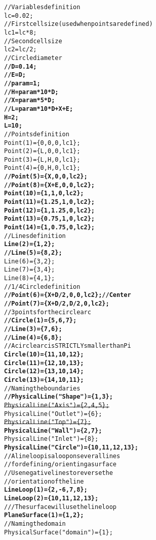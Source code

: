 \begin{alltt}
// Variables definition
lc = 0.02;
// First cell size (used when points are defined)
lc1 = lc * 8;
// Second cell size
lc2 = lc / 2;
// Circle diameter
{\bf{//D = 0.14 ;}}
{\bf{//E = D ;}}
{\bf{//param = 1;}}
{\bf{//H = param * 10 * D ;}}
{\bf{//X = param * 5 * D ;}}
{\bf{//L = param * 10 * D + X + E;}}
{\bf{H=2;}}
{\bf{L=10;}}
// Points definition 
Point(1)=\{0,0,0,lc1\};
Point(2) = \{L,0,0,lc1\};
Point(3) = \{L,H,0,lc1\};
Point(4) = \{0,H,0,lc1\};
{\bf{//Point(5) = \{X,0,0,lc2\};}}
{\bf{//Point(8) = \{X+E,0,0,lc2\};}}
{\bf{Point(10)= \{1,1,0,lc2\};}}
{\bf{Point(11)=\{1.25,1,0,lc2\}; }}
{\bf{Point(12)=\{1,1.25,0,lc2\}; }}
{\bf{Point(13)=\{0.75,1,0,lc2\}; }}
{\bf{Point(14)=\{1,0.75,0,lc2\};}}
// Lines definition
{\bf{Line(2) = \{1,2\};}}
{\bf{//Line(5) = \{8,2\};}}
Line(6) = \{3,2\};
Line(7) = \{3,4\};
Line(8) = \{4,1\};
// 1/4 Circle definition
{\bf{//Point(6) = \{X+D/2,0,0,lc2\}; // Center }}
{\bf{//Point(7) = \{X+D/2,D/2,0,lc2\};}}
// 3 points for the circle arc
{\bf{//Circle(1) = \{5,6,7\};}}
{\bf{//Line(3) = \{7,6\};}}
{\bf{//Line(4) = \{6,8\};}}
// A circle arc is STRICTLY smaller than Pi
{\bf{Circle(10)=\{11,10,12\}; }}
{\bf{Circle(11)=\{12,10,13\}; }}
{\bf{Circle(12)=\{13,10,14\}; }}
{\bf{Circle(13)=\{14,10,11\}; }}
// Naming the boundaries
{\bf{//Physical Line("Shape") = \{1,3\};}}
{\sout{Physical Line("Axis") = \{2 {\sout{,4,5}} \}; }}
Physical Line("Outlet") = \{6\};
{\sout{Physical Line("Top") = \{7\}; }}
{\bf{Physical Line("Wall") = \{2,7\};}}
Physical Line("Inlet") = \{8\};
{\bf{Physical Line("Circle") = \{10,11,12,13\};}}
// A lineloop is a loop on several lines
// for defining/orienting a surface
// Use negative lines to reverse the
// orientation of the line
{\bf{Line Loop(1) = \{2,-6,7,8\};}}
{\bf{Line Loop(2) = \{10,11,12,13\};}}
/// The surface will use the lineloop
{\bf{Plane Surface(1) = \{1,2\};}}
// Naming the domain
Physical Surface("domain") = \{1\};
\end{alltt}
